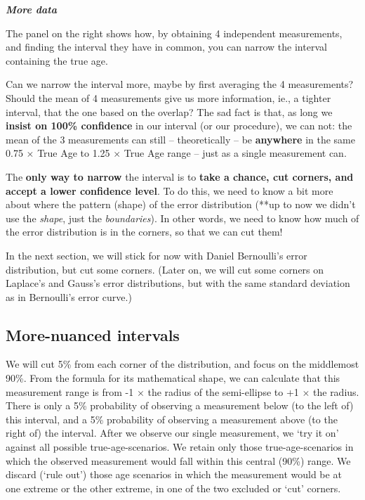 \documentclass[
]{article}
\begin{document}
\textbf{\emph{More data}}

The panel on the right shows how, by obtaining 4 independent
measurements, and finding the interval they have in common, you can
narrow the interval containing the true age.

Can we narrow the interval more, maybe by first averaging the 4
measurements? Should the mean of 4 measurements give us more
information, ie., a tighter interval, that the one based on the overlap?
The sad fact is that, as long we \textbf{insist on 100\% confidence} in
our interval (or our procedure), we can not: the mean of the 3
measurements can still -- theoretically -- be \textbf{anywhere} in the
same 0.75 \(\times\) True Age to 1.25 \(\times\) True Age range -- just
as a single measurement can.

The \textbf{only way to narrow} the interval is to \textbf{take a
chance, cut corners, and accept a lower confidence level}. To do this,
we need to know a bit more about where the pattern (shape) of the error
distribution (**up to now we didn't use the \emph{shape}, just the
\emph{boundaries}). In other words, we need to know how much of the
error distribution is in the corners, so that we can cut them!

In the next section, we will stick for now with Daniel Bernoulli's error
distribution, but cut some corners. (Later on, we will cut some corners
on Laplace's and Gauss's error distributions, but with the same standard
deviation as in Bernoulli's error curve.)

\hypertarget{more-nuanced-intervals}{%
\subsection{More-nuanced intervals}\label{more-nuanced-intervals}}

We will cut 5\% from each corner of the distribution, and focus on the
middlemost 90\%. From the formula for its mathematical shape, we can
calculate that this measurement range is from -1 \(\times\) the radius
of the semi-ellipse to +1 \(\times\) the radius. There is only a 5\%
probability of observing a measurement below (to the left of) this
interval, and a 5\% probability of observing a measurement above (to the
right of) the interval. After we observe our single measurement, we `try
it on' against all possible true-age-scenarios. We retain only those
true-age-scenarios in which the observed measurement would fall within
this central (90\%) range. We discard (`rule out') those age scenarios
in which the measurement would be at one extreme or the other extreme,
in one of the two excluded or `cut' corners.
\end{document}
